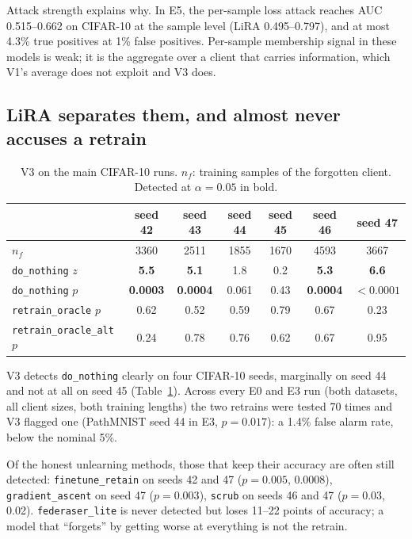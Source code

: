 \documentclass[11pt]{article}
\newcommand{\m}[1]{\texttt{#1}}
\newcommand{\dn}{\m{do\_nothing}}
\newcommand{\ro}{\m{retrain\_oracle}}
\newcommand{\roalt}{\m{retrain\_oracle\_alt}}
\begin{document}
Attack strength explains why. In E5, the per-sample loss attack reaches AUC
0.515--0.662 on CIFAR-10 at the sample level (LiRA 0.495--0.797), and at most
4.3\% true positives at 1\% false positives. Per-sample membership signal in
these models is weak; it is the aggregate over a client that carries
information, which V1's average does not exploit and V3 does.

\subsection{LiRA separates them, and almost never accuses a retrain}
\label{sec:lira}

\begin{table}[t]
\centering
\caption{V3 on the main CIFAR-10 runs. $n_f$: training samples of the forgotten
client. Detected at $\alpha=0.05$ in bold.}
\label{tab:v3}
\small
\begin{tabular}{lcccccc}
\toprule
 & seed 42 & seed 43 & seed 44 & seed 45 & seed 46 & seed 47\\
\midrule
$n_f$ & 3360 & 2511 & 1855 & 1670 & 4593 & 3667\\
\dn{} $z$ & \textbf{5.5} & \textbf{5.1} & 1.8 & 0.2 & \textbf{5.3} & \textbf{6.6}\\
\dn{} $p$ & \textbf{0.0003} & \textbf{0.0004} & 0.061 & 0.43 & \textbf{0.0004} & $\mathbf{<0.0001}$\\
\ro{} $p$ & 0.62 & 0.52 & 0.59 & 0.79 & 0.67 & 0.23\\
\roalt{} $p$ & 0.24 & 0.78 & 0.76 & 0.62 & 0.67 & 0.95\\
\bottomrule
\end{tabular}
\end{table}

V3 detects \dn{} clearly on four CIFAR-10 seeds, marginally on seed 44 and not
at all on seed 45 (Table~\ref{tab:v3}). Across every E0 and E3 run (both
datasets, all client sizes, both training lengths) the two retrains were tested
70 times and V3 flagged one (PathMNIST seed 44 in E3, $p=0.017$): a 1.4\% false
alarm rate, below the nominal 5\%.

Of the honest unlearning methods, those that keep their accuracy are often
still detected: \m{finetune\_retain} on seeds 42 and 47 ($p=0.005$, 0.0008),
\m{gradient\_ascent} on seed 47 ($p=0.003$), \m{scrub} on seeds 46 and 47
($p=0.03$, 0.02). \m{federaser\_lite} is never detected but loses 11--22 points
of accuracy; a model that ``forgets'' by getting worse at everything is not the
retrain.
\end{document}
